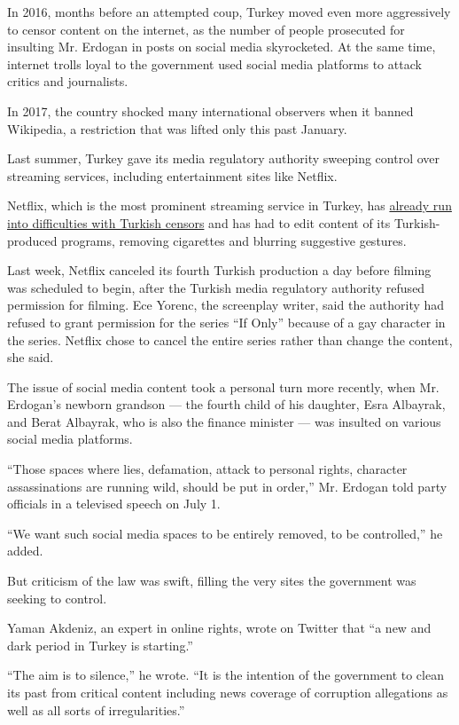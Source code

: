In 2016, months before an attempted coup, Turkey moved even more
aggressively to censor content on the internet, as the number of people
prosecuted for insulting Mr. Erdogan in posts on social media
skyrocketed. At the same time, internet trolls loyal to the government
used social media platforms to attack critics and journalists.

In 2017, the country shocked many international observers when it banned
Wikipedia, a restriction that was lifted only this past January.

Last summer, Turkey gave its media regulatory authority sweeping control
over streaming services, including entertainment sites like Netflix.

Netflix, which is the most prominent streaming service in Turkey, has
\href{https://www.nytimes3xbfgragh.onion/2019/10/31/arts/television/netflix-censorship-turkey-india.html}{already
run into difficulties with Turkish censors} and has had to edit content
of its Turkish-produced programs, removing cigarettes and blurring
suggestive gestures.

Last week, Netflix canceled its fourth Turkish production a day before
filming was scheduled to begin, after the Turkish media regulatory
authority refused permission for filming. Ece Yorenc, the screenplay
writer, said the authority had refused to grant permission for the
series ``If Only'' because of a gay character in the series. Netflix
chose to cancel the entire series rather than change the content, she
said.

The issue of social media content took a personal turn more recently,
when Mr. Erdogan's newborn grandson --- the fourth child of his
daughter, Esra Albayrak, and Berat Albayrak, who is also the finance
minister --- was insulted on various social media platforms.

``Those spaces where lies, defamation, attack to personal rights,
character assassinations are running wild, should be put in order,'' Mr.
Erdogan told party officials in a televised speech on July 1.

``We want such social media spaces to be entirely removed, to be
controlled,'' he added.

But criticism of the law was swift, filling the very sites the
government was seeking to control.

Yaman Akdeniz, an expert in online rights, wrote on Twitter that ``a new
and dark period in Turkey is starting.''

``The aim is to silence,'' he wrote. ``It is the intention of the
government to clean its past from critical content including news
coverage of corruption allegations as well as all sorts of
irregularities.''

